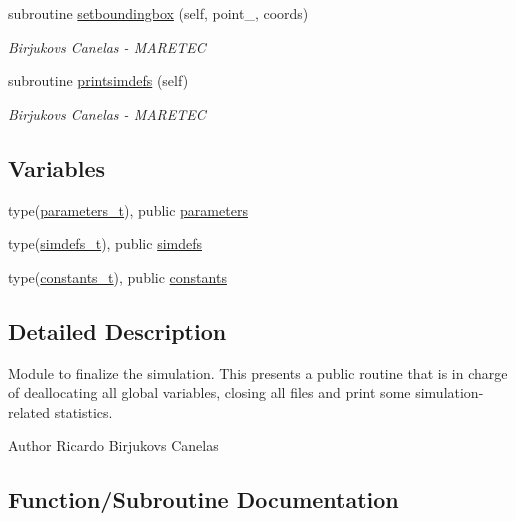 \begin{DoxyCompactItemize}
subroutine \mbox{\hyperlink{namespacesimulation__globals_a1fc4653684d73efecdbd140b6cafe541}{setboundingbox}} (self, point\+\_\+, coords)
\begin{DoxyCompactList}\small\item\em Birjukovs Canelas -\/ M\+A\+R\+E\+T\+EC \end{DoxyCompactList}\item 
subroutine \mbox{\hyperlink{namespacesimulation__globals_ad90d6959da1d43e2cd1febff82187ed5}{printsimdefs}} (self)
\begin{DoxyCompactList}\small\item\em Birjukovs Canelas -\/ M\+A\+R\+E\+T\+EC \end{DoxyCompactList}\end{DoxyCompactItemize}
\subsection*{Variables}
\begin{DoxyCompactItemize}
\item 
type(\mbox{\hyperlink{structsimulation__globals_1_1parameters__t}{parameters\+\_\+t}}), public \mbox{\hyperlink{namespacesimulation__globals_ac23e87cbb2256792d683ab1bf5dc5e21}{parameters}}
\item 
type(\mbox{\hyperlink{structsimulation__globals_1_1simdefs__t}{simdefs\+\_\+t}}), public \mbox{\hyperlink{namespacesimulation__globals_ae851f977b442737307cd4bb76f2f68be}{simdefs}}
\item 
type(\mbox{\hyperlink{structsimulation__globals_1_1constants__t}{constants\+\_\+t}}), public \mbox{\hyperlink{namespacesimulation__globals_aa3e1a54abbb08d2c09978a3509ec4303}{constants}}
\end{DoxyCompactItemize}


\subsection{Detailed Description}
Module to finalize the simulation. This presents a public routine that is in charge of deallocating all global variables, closing all files and print some simulation-\/related statistics. 

\begin{DoxyAuthor}{Author}
Ricardo Birjukovs Canelas 
\end{DoxyAuthor}


\subsection{Function/\+Subroutine Documentation}
\mbox{\label{namespacesimulation__globals_a2c6bf88542c503d1da58280ab3dcf772}} 
